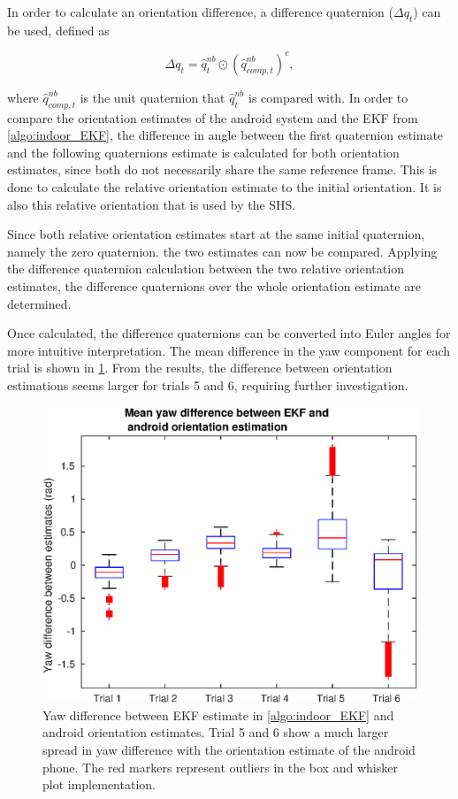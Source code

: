 In order to calculate an orientation difference, a difference quaternion ($	\Delta q_t$) can be used, defined as \cite{Kok2017}

\begin{equation}
	\Delta q_t = \hat{q}_{t}^{nb} \odot \left( \hat{q}_{comp,t}^{nb}  \right)^c,
\end{equation} 

where $\hat{q}_{comp,t}^{nb}$ is the unit quaternion that $ \hat{q}_{t}^{nb} $ is compared with.  In order to compare the orientation estimates of the android system and the EKF from \cref{algo:indoor_EKF}, the difference in angle between the first quaternion estimate and the following quaternions estimate is calculated for both orientation estimates, since both do not necessarily share the same reference frame. This is done to calculate the relative orientation estimate to the initial orientation. It is also this relative orientation that is used by the \ac{SHS}.\par 

Since both relative orientation estimates start at the same initial quaternion, namely the zero quaternion. the two estimates can now be compared. Applying the difference quaternion calculation between the two relative orientation estimates, the difference quaternions over the whole orientation estimate are determined.  \par 

Once calculated, the difference quaternions can be converted into Euler angles for more intuitive interpretation. The mean difference in the yaw component for each trial is shown in  \cref{fig:yaw_difference_between_android_and_ekf_1}. From the results, the difference between orientation estimations seems larger for trials 5 and 6, requiring further investigation.

\begin{figure}[H]
	\centering
	\includegraphics[width=0.7\linewidth]{images/20201201_1212_Mean_yaw_difference_between_EKF_android_1}
	\setlength{\belowcaptionskip}{-10pt}
	\caption{Yaw difference between EKF estimate in \cref{algo:indoor_EKF} and android orientation estimates. Trial 5 and 6 show a much larger spread in yaw difference with the orientation estimate of the android phone. The red markers represent outliers in the box and whisker plot implementation.}
	\label{fig:yaw_difference_between_android_and_ekf_1}
\end{figure}

